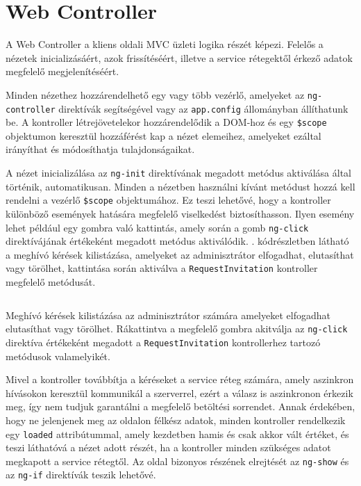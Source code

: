 \section{Web Controller}
\label{sec:webController}
A Web Controller a kliens oldali MVC üzleti logika részét képezi. Felelős a nézetek inicializásáért, azok frissítéséért, illetve a service rétegektől érkező adatok megfelelő megjelenítéséért. 

Minden nézethez hozzárendelhető egy vagy több vezérlő, amelyeket az \texttt{ng-controller} direktívák segítségével vagy az \texttt{app.config} állományban állíthatunk be. A kontroller létrejövetelekor hozzárendelődik a DOM-hoz és egy \texttt{\$scope} objektumon keresztül hozzáférést kap a nézet elemeihez, amelyeket ezáltal irányíthat és módosíthatja tulajdonságaikat. 

A nézet inicializálása az \texttt{ng-init} direktívának megadott metódus aktiválása által történik, automatikusan. Minden a nézetben használni kívánt metódust hozzá kell rendelni a vezérlő \texttt{\$scope}  objektumához. Ez teszi lehetővé, hogy a kontroller különböző események hatására megfelelő viselkedést biztosíthasson. Ilyen esemény lehet például egy gombra való kattintás, amely során a gomb \texttt{ng-click} direktívájának értékeként megadott metódus aktiválódik. . kódrészletben látható a meghívó kérések kilistázása, amelyeket az adminisztrátor elfogadhat, elutasíthat vagy törölhet, kattintása során aktiválva a \texttt{RequestInvitation} kontroller megfelelő metódusát.

\begin{listing}
  \inputminted[fontsize=\small]{html}{progfiles/ngClick.html}
  \caption{Meghívó kérések kilistázása az adminisztrátor számára\protect{,} amelyeket elfogadhat\protect{,} elutasíthat vagy törölhet. Rákattintva a megfelelő gombra akitválja az \texttt{ng-click} direktíva értékeként megadott\protect{,} a \texttt{RequestInvitation} kontrollerhez tartozó metódusok valamelyikét.}
  \label{lst:ngClick}
\end{listing}

Mivel a kontroller továbbítja a kéréseket a service réteg számára, amely aszinkron hívásokon keresztül kommunikál a szerverrel, ezért a válasz is aszinkronon érkezik meg, így nem tudjuk garantálni a megfelelő betöltési sorrendet. Annak érdekében, hogy ne jelenjenek meg az oldalon félkész adatok, minden kontroller rendelkezik egy \texttt{loaded} attribútummal, amely kezdetben hamis és csak akkor vált értéket, és teszi láthatóvá a nézet adott részét, ha a kontroller minden szükséges adatot megkapott a service rétegtől. Az oldal bizonyos részének elrejtését az  \texttt{ng-show} és az \texttt{ng-if} direktívák teszik lehetővé. 


